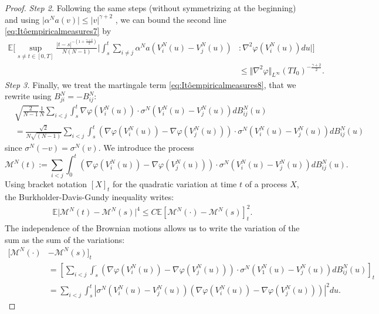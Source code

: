\documentclass[11pt,a4paper]{article}
\theoremstyle{definition}
\theoremstyle{plain}
\begin{document}
\begin{proof}
\textit{Step 2.} Following the same steps (without symmetrizing at the beginning) and using $\vert \alpha^N a(v)\vert\leq  \vert v \vert^{\gamma+2}$ , we can bound the second line \eqref{eq:Itôempiricalmeasures7} by
\begin{align}
\label{eq:tightcond3}
    \mathbb{E}\Bigg[\sup_{s\neq t\in[0,T]} \frac{\vert t-s\vert^{-(1+\frac{\gamma+2}{2})}}{N(N-1)}\Bigg\vert \int_s^t \sum_{i\neq j}  \alpha^Na\left(V^N_i(u) -V^N_j(u)\right)&:\nabla^2\varphi\left(V^N_i(u)\right)du \Bigg\vert\Bigg]\nonumber\\
    &\leq \Vert \nabla^2 \varphi\Vert_{L^\infty}\left(TI_0\right)^{-\frac{\gamma+2}{2}}.
\end{align}
\textit{Step 3.} Finally, we treat the martingale term \eqref{eq:Itôempiricalmeasures8}, that we rewrite using $B^N_{ji}=-B^N_{ij}$:
    \begin{align*}
        & \sqrt{\frac{2}{N-1}}\frac{1}{N}\sum_{i<j} \int_s^t  \nabla \varphi\left(V^N_i(u)\right)\cdot \sigma^N \left(V^N_i(u) - V^N_j(u)\right)dB^N_{ij}(u)\\
    &= \frac{\sqrt{2}}{N\sqrt{(N-1)}}\sum_{i<j} \int_s^t  \left(\nabla\varphi\left(V^N_i(u)\right)-\nabla\varphi\left(V^N_j(u)\right)\right)\cdot \sigma^N \left(V^N_i(u) - V^N_j(u)\right)dB^N_{ij}(u)
    \end{align*}
    since $\sigma^N(-v)=\sigma^N(v)$.
    We introduce the process
    $$\mathcal{M}^N(t):=\sum_{i<j} \int_0^t  \left(\nabla\varphi\left(V^N_i(u)\right)-\nabla\varphi\left(V^N_j(u)\right)\right)\cdot \sigma^N \left(V^N_i(u) - V^N_j(u)\right)dB^N_{ij}(u).$$
    Using bracket notation $\left[ X\right]_t$ for the quadratic variation at time $t$ of a process $X$, the Burkholder-Davis-Gundy inequality \cite[Corollary 4.2]{RevuzYor1999} writes:
\begin{align*}
    \mathbb{E} \vert \mathcal{M}^N(t)-\mathcal{M}^N(s) \vert^4 \leq C \mathbb{E} \left[ \mathcal{M}^N(\cdot)-\mathcal{M}^N(s)\right]_t^2.
\end{align*}
The independence of the Brownian motions allows us to write the variation of the sum as the sum of the variations:
\begin{align*}
    \big[ \mathcal{M}^N(\cdot)&-\mathcal{M}^N(s)\big]_t\\
    &=\left[ \sum_{i<j}\int_{s}^\cdot \left(\nabla\varphi\left(V^N_i(u)\right)-\nabla\varphi\left(V^N_j(u)\right)\right) \cdot \sigma^N(V^N_1(u) - V^N_j(u)) dB^{N}_{ij}(u)\right]_t\\
    &=\sum_{i<j} \int_{s}^t \left\vert\sigma^N(V^N_i(u) - V^N_j(u)) \left(\nabla\varphi\left(V^N_i(u)\right)-\nabla\varphi\left(V^N_j(u)\right)\right) \right\vert^2  du.

\end{align*}
\end{proof}
\end{document}

